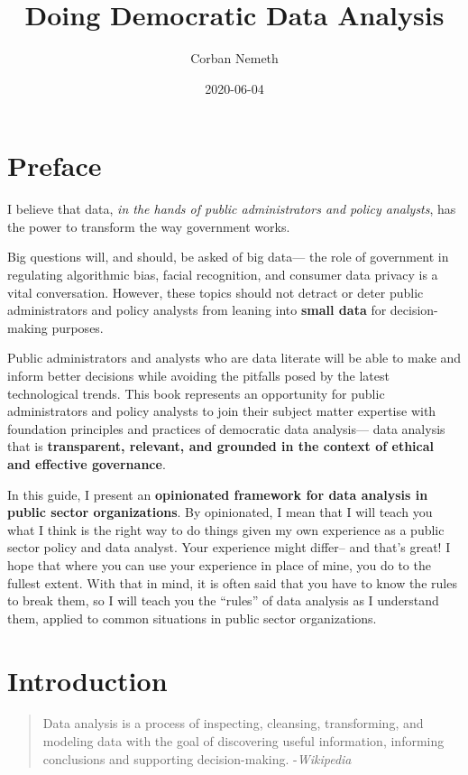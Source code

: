 \documentclass[
]{book}
\title{Doing Democratic Data Analysis}
\author{Corban Nemeth}
\date{2020-06-04}
\begin{document}
\maketitle

{
\setcounter{tocdepth}{1}
\tableofcontents
}
\hypertarget{preface}{%
\chapter*{Preface}\label{preface}}

I believe that data, \emph{in the hands of public administrators and policy analysts}, has the power to transform the way government works.

Big questions will, and should, be asked of big data--- the role of government in regulating algorithmic bias, facial recognition, and consumer data privacy is a vital conversation. However, these topics should not detract or deter public administrators and policy analysts from leaning into \textbf{small data} for decision-making purposes.

Public administrators and analysts who are data literate will be able to make and inform better decisions while avoiding the pitfalls posed by the latest technological trends. This book represents an opportunity for public administrators and policy analysts to join their subject matter expertise with foundation principles and practices of democratic data analysis--- data analysis that is \textbf{transparent, relevant, and grounded in the context of ethical and effective governance}.

In this guide, I present an \textbf{opinionated framework for data analysis in public sector organizations}. By opinionated, I mean that I will teach you what I think is the right way to do things given my own experience as a public sector policy and data analyst. Your experience might differ-- and that's great! I hope that where you can use your experience in place of mine, you do to the fullest extent. With that in mind, it is often said that you have to know the rules to break them, so I will teach you the ``rules'' of data analysis as I understand them, applied to common situations in public sector organizations.

\hypertarget{intro}{%
\chapter{Introduction}\label{intro}}

\begin{quote}
Data analysis is a process of inspecting, cleansing, transforming, and modeling data with the goal of discovering useful information, informing conclusions and supporting decision-making. -\emph{Wikipedia}
\end{quote}
\end{document}

